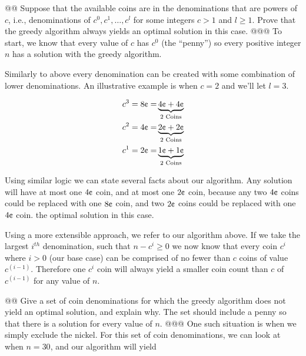 \documentclass[10pt]{article}
\begin{document}
\begin{easylist}[enumerate]
    @@ Suppose that the available coins are in the denominations that are powers of $c$, i.e., denominations of $c^0,
    c^1, \ldots, c^l$ for some integers $c > 1$ and $l \ge 1$. Prove that the greedy algorithm always yields an optimal
    solution in this case.
    @@@ To start, we know that every value of $c$ has $c^0$ (the ``penny'') so every positive integer $n$ has a solution with
        the greedy algorithm.\newline

        Similarly to above every denomination can be created with some combination of lower denominations. An
        illustrative example is when $c=2$ and we'll let $l=3$.

            \[ \begin{aligned}
                c^3 = 8 \cents =& \underbrace{4 \cents + 4 \cents}_{\text{2 Coins} }\\
                c^2 = 4 \cents =& \underbrace{2 \cents + 2 \cents}_{\text{2 Coins} }\\
                c^1 = 2 \cents =& \underbrace{1 \cents + 1 \cents}_{\text{2 Coins} }\\
            \end{aligned} \]

        Using similar logic we can state several facts about our algorithm. Any solution will have at most one $4
        \cents$ coin, and at most one $2 \cents$ coin, because any two $4 \cents$ coins could be replaced with one $8
        \cents$ coin, and two $2 \cents$ coins could be replaced with one $4 \cents$ coin.
        the optimal solution in this case.\newline

        Using a more extensible approach, we refer to our algorithm above. If we take the largest $i^{th}$ denomination,
        such that $n - c^i \ge  0$ we now know that every coin $c^i$ where $i > 0$ (our base case) can be comprised of
        no fewer than $c$ coins of value $c^{(i-1)}$. Therefore one $c^i$ coin will always yield a smaller coin count
        than $c$ of $c^(i-1)$ for any value of $n$.


    @@ Give a set of coin denominations for which the greedy algorithm does not yield an optimal solution, and explain
    why. The set should include a penny so that there is a solution for every value of $n$.
    @@@ One such situation is when we simply exclude the nickel. For this set of coin denominations, we can look at when
    $n=30$, and our algorithm will yield


\end{easylist}
\end{document}
